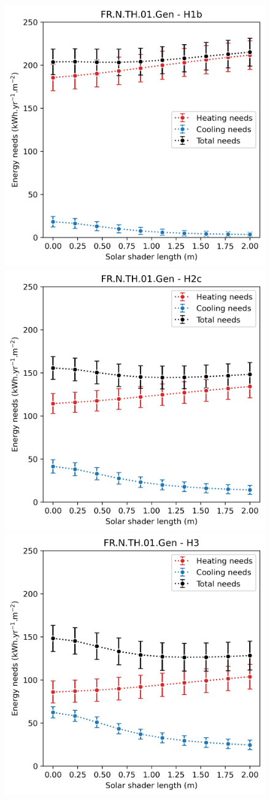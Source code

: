 \documentclass[11pt]{article}
\begin{document}
        \begin{figure}[ht]
            \centering
            \includegraphics[width=0.32\columnwidth]{figures/shading_FR.N.TH.01.Gen_H1b_conventionnel_th-bce_2020_2000-2020.png}
            \includegraphics[width=0.32\columnwidth]{figures/shading_FR.N.TH.01.Gen_H2c_conventionnel_th-bce_2020_2000-2020.png}
            \includegraphics[width=0.32\columnwidth]{figures/shading_FR.N.TH.01.Gen_H3_conventionnel_th-bce_2020_2000-2020.png}\\

\end{figure}
\end{document}

